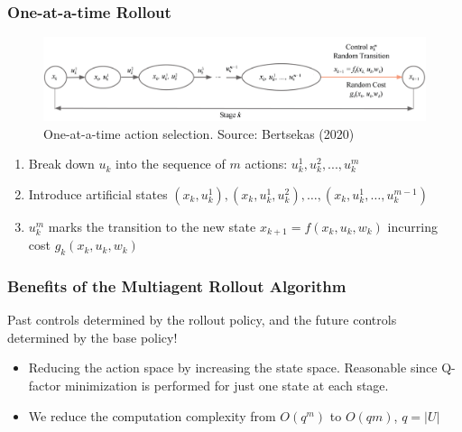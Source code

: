 \documentclass{beamer}
\begin{document}
\begin{frame}
	\frametitle{One-at-a-time Rollout}
	
    \begin{figure}
	\includegraphics[scale=0.4]{2b}
	\caption{One-at-a-time action selection. Source: Bertsekas (2020)}
	\end{figure}	
	
		
	\begin{enumerate}
		\item Break down $u_k$ into the sequence of $m$ actions: 
		$u^1_k, u^2_k, ..., u^m_k$
		
		\item Introduce artificial states $\left(x_{k}, u_{k}^{1}\right),\left(x_{k}, u_{k}^{1}, u_{k}^{2}\right), \ldots,\left(x_{k}, u_{k}^{1}, \ldots, u_{k}^{m-1}\right)$
		\item $u^m_k$ marks the transition to the new state 
		$x_{k+1}=f(x_k, u_k, w_k)$ incurring cost $g_k(x_k, u_k, w_k)$
	\end{enumerate}


	
\end{frame}



    \begin{frame}
	\frametitle{Benefits of the Multiagent Rollout Algorithm}
	
			Past controls determined by
		the rollout policy, and the future controls determined by
		the base policy!
	
	
	
	\begin{itemize}
		\item Reducing the action space by increasing the state space. Reasonable since Q-factor minimization is performed for just
		one state at each stage. 	
		
		\item We reduce the computation complexity 
		from $O(q^m)$ to $O(qm)$, $q=|U|$
	\end{itemize}
	
	
	\end{frame}
\end{document}
